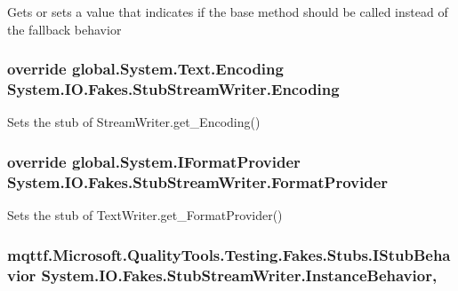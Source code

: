 Gets or sets a value that indicates if the base method should be called instead of the fallback behavior

\hypertarget{class_system_1_1_i_o_1_1_fakes_1_1_stub_stream_writer_a68af4697f23bea227622c18a8570f7cc}{
\subsubsection[{Encoding}]{\setlength{\rightskip}{0pt plus 5cm}override global.\-System.\-Text.\-Encoding System.\-I\-O.\-Fakes.\-Stub\-Stream\-Writer.\-Encoding\hspace{0.3cm}{\ttfamily [get]}}}\label{class_system_1_1_i_o_1_1_fakes_1_1_stub_stream_writer_a68af4697f23bea227622c18a8570f7cc}


Sets the stub of Stream\-Writer.\-get\-\_\-\-Encoding()

\hypertarget{class_system_1_1_i_o_1_1_fakes_1_1_stub_stream_writer_a4f224bef2d01adfd14fd75c3ff5d523f}{
\subsubsection[{Format\-Provider}]{\setlength{\rightskip}{0pt plus 5cm}override global.\-System.\-I\-Format\-Provider System.\-I\-O.\-Fakes.\-Stub\-Stream\-Writer.\-Format\-Provider\hspace{0.3cm}{\ttfamily [get]}}}\label{class_system_1_1_i_o_1_1_fakes_1_1_stub_stream_writer_a4f224bef2d01adfd14fd75c3ff5d523f}


Sets the stub of Text\-Writer.\-get\-\_\-\-Format\-Provider()

\hypertarget{class_system_1_1_i_o_1_1_fakes_1_1_stub_stream_writer_ac75f270da6040b457ca503b589400b3b}{
\subsubsection[{Instance\-Behavior}]{\setlength{\rightskip}{0pt plus 5cm}mqttf.\-Microsoft.\-Quality\-Tools.\-Testing.\-Fakes.\-Stubs.\-I\-Stub\-Behavior System.\-I\-O.\-Fakes.\-Stub\-Stream\-Writer.\-Instance\-Behavior\hspace{0.3cm}{\ttfamily [get]}, {\ttfamily [set]}}}\label{class_system_1_1_i_o_1_1_fakes_1_1_stub_stream_writer_ac75f270da6040b457ca503b589400b3b}


